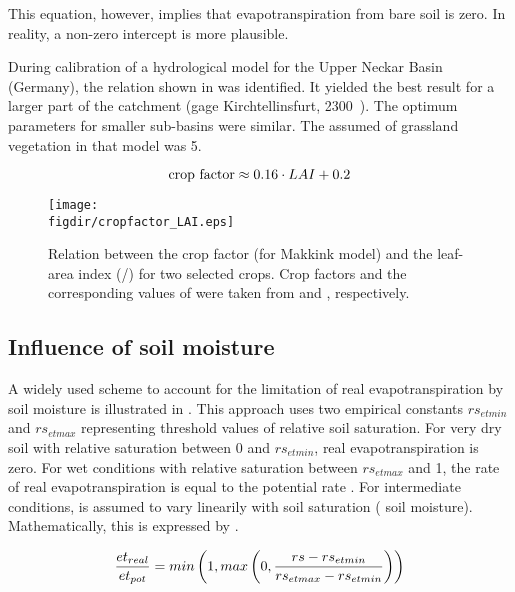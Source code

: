 This equation, however, implies that evapotranspiration from bare soil is zero. In reality, a non-zero intercept is more plausible.

During calibration of a hydrological model for the Upper Neckar Basin (Germany), the relation shown in  was identified. It yielded the best result for a larger part of the catchment (gage Kirchtellinsfurt, 2300~\sqkm). The optimum parameters for smaller sub-basins were similar. The assumed \leafAreaIndex{} of grassland vegetation in that model was 5.

\begin{equation} \label{eqn:et:real:cropfactor-LAI-Neckar}
  \text{crop factor} \approx 0.16 \cdot LAI + 0.2 
\end{equation}



\begin{figure}
  \centering
  \texttt{[image: \\figdir/cropfactor\_LAI.eps]}
  \caption[Relation between the crop factor (for Makkink model) and the leaf-area index (\sqm/\sqm) for two selected crops.]{Relation between the crop factor (for Makkink model) and the leaf-area index (\sqm/\sqm) for two selected crops. Crop factors and the corresponding values of \leafAreaIndex{} were taken from \citet{Feddes1987} and \citet{Ludwig2006}, respectively. \label{fig:et:real:cropfactor-LAI}}
\end{figure}

\subsection{Influence of soil moisture} \label{sec:et:real:soilmoisture}

A widely used scheme to account for the limitation of real evapotranspiration by soil moisture is illustrated in . This approach uses two empirical constants $rs_{et min}$ and $rs_{et max}$ representing threshold values of relative soil saturation. For very dry soil with relative saturation between 0 and $rs_{et min}$, real evapotranspiration is zero. For wet conditions with relative saturation between $rs_{et max}$ and 1, the rate of real evapotranspiration \etReal{} is equal to the potential rate \etPot{}. For intermediate conditions, \etReal{} is assumed to vary linearily with soil saturation (\ie{} soil moisture). Mathematically, this is expressed by .

\begin{equation} \label{eqn:et:real:soilmoisture}
  \frac{et_{real}}{et_{pot}} = min\left(1, max\left(0, \frac{rs-rs_{et min}}{rs_{et max}-rs_{et min}} \right)\right)
\end{equation}

